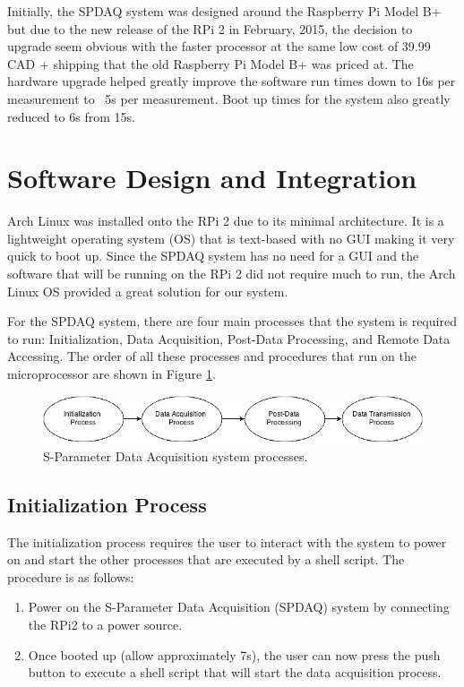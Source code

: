 Initially, the SPDAQ system was designed around the Raspberry Pi Model B+ but due to the new release of the RPi 2 in
February, 2015, the decision to upgrade seem obvious with the faster processor at the same low cost of 39.99 CAD + shipping
that the old Raspberry Pi Model B+ was priced at.  The hardware upgrade helped greatly improve the software run times down to
16s per measurement to ~5s per measurement.  Boot up times for the system also greatly reduced to 6s from 15s.

\section{Software Design and Integration}

Arch Linux was installed onto the RPi 2 due to its minimal architecture. It is a lightweight operating system (OS) that is
text-based with no GUI making it very quick to boot up.  Since the SPDAQ system has no need for a GUI and the software that
will be running on the RPi 2 did not require much to run, the Arch Linux OS provided a great solution for our system.

For the SPDAQ system, there are four main processes that the system is required to run: Initialization, Data Acquisition,
Post-Data Processing, and Remote Data Accessing. The order of all these processes and procedures that run on the
microprocessor are shown in Figure \ref{fig:procs}.

\begin{figure}[h]
\begin{center}
\includegraphics[width=5.4in]{./images/procs.png}
\caption{S-Parameter Data Acquisition system processes.}
\label{fig:procs}
\end{center}
\end{figure}

\subsection{Initialization Process}

The initialization process requires the user to interact with the system to power on and start the other processes that are
executed by a shell script.  The procedure is as follows:

\begin{enumerate}
\item Power on the S-Parameter Data Acquisition (SPDAQ) system by connecting the RPi2 to a power source.
\item Once booted up (allow approximately 7s), the user can now press the push button to execute a shell script that will start the data acquisition process.
\end{enumerate}

